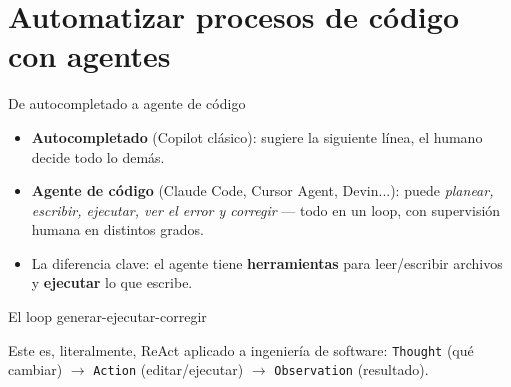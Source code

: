 \section{Automatizar procesos de código con agentes}

\begin{frame}{De autocompletado a agente de código}
  \begin{itemize}
    \item \textbf{Autocompletado} (Copilot clásico): sugiere la siguiente
      línea, el humano decide todo lo demás.
    \item \textbf{Agente de código} (Claude Code, Cursor Agent, Devin...):
      puede \emph{planear, escribir, ejecutar, ver el error y corregir} —
      todo en un loop, con supervisión humana en distintos grados.
    \item La diferencia clave: el agente tiene \textbf{herramientas} para
      leer/escribir archivos y \textbf{ejecutar} lo que escribe.
  \end{itemize}
\end{frame}

\begin{frame}{El loop generar-ejecutar-corregir}
  \centering
  \vfill
  \footnotesize Este es, literalmente, ReAct aplicado a ingeniería de software:
  \texttt{Thought} (qué cambiar) $\to$ \texttt{Action} (editar/ejecutar) $\to$
  \texttt{Observation} (resultado).
\end{frame}

